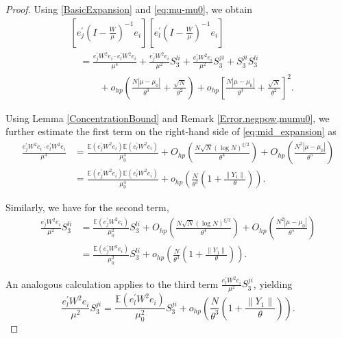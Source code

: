 \documentclass[11pt, reqno]{amsart}
\numberwithin{equation}{section}
\begin{document}
\begin{proof}
Using \eqref{BasicExpansion} and \eqref{eq:mu-mu0}, we obtain
\begin{align}
\nonumber &\left[e_j^\prime\left(I - \frac{W}{\mu}\right)^{-1}e_i\right]\left[e_l^\prime\left(I - \frac{W}{\mu}\right)^{-1}e_i\right] \\
\nonumber &\quad= \frac{e_j^\prime W^2 e_i \cdot e_l^\prime W^2 e_i}{\mu^4} + \frac{e_j^\prime W^2 e_i}{\mu^2} S_3^{li} + \frac{e_l^\prime W^2 e_i}{\mu^2} S_3^{ji}+ S_3^{ji}S_3^{li} \\
&\qquad\quad+o_{hp}\left(\frac{N|\mu - \mu_0|}{\theta^3} + \frac{\sqrt{N}}{\theta^2}\right) + o_{hp}\left[\frac{N|\mu - \mu_0|}{\theta^3} + \frac{\sqrt{N}}{\theta^2}\right]^2.\label{eq:mid_expansion}
\end{align}

Using Lemma \ref{ConcentrationBound} and Remark \ref{Error.negpow,mumu0}, we further estimate the first term on the right-hand side of \eqref{eq:mid_expansion} as
\begin{align}
\frac{e_j^\prime W^2 e_i \cdot e_l^\prime W^2 e_i}{\mu^4} &= \frac{\mathbb E(e_j^\prime W^2 e_i) \mathbb E(e_l^\prime W^2 e_i)}{\mu_0^4} + O_{hp}\left(\frac{N\sqrt{N}(\log N)^{\xi/2}}{\theta^4}\right) + O_{hp}\left(\frac{N^2|\mu - \mu_0|}{\theta^5}\right) \\
&= \frac{\mathbb E(e_j^\prime W^2 e_i) \mathbb E(e_l^\prime W^2 e_i)}{\mu_0^4} + o_{hp}\left(\frac{N}{\theta^3}\left(1 + \frac{\|Y_1\|}{\theta}\right)\right).\label{eq:first_term_estimate}
\end{align}

Similarly, we have for the second term,
\begin{align}
\frac{e_j^\prime W^2 e_i}{\mu^2} S_3^{li} &= \frac{\mathbb E(e_j^\prime W^2 e_i)}{\mu_0^2} S_3^{li} + O_{hp}\left(\frac{N\sqrt{N}(\log N)^{\xi/2}}{\theta^4}\right) + O_{hp}\left(\frac{N^2|\mu - \mu_0|}{\theta^5}\right) \\
&= \frac{\mathbb E(e_j^\prime W^2 e_i)}{\mu_0^2} S_3^{li} + o_{hp}\left(\frac{N}{\theta^3}\left(1 + \frac{\|Y_1\|}{\theta}\right)\right).\label{eq:second_term_estimate}
\end{align}

An analogous calculation applies to the third term $\frac{e_l^\prime W^2 e_i}{\mu^2} S_3^{ji}$, yielding
\begin{equation}\label{eq:third_term_estimate}
\frac{e_l^\prime W^2 e_i}{\mu^2} S_3^{ji} = \frac{\mathbb E(e_l^\prime W^2 e_i)}{\mu_0^2} S_3^{ji} + o_{hp}\left(\frac{N}{\theta^3}\left(1 + \frac{\|Y_1\|}{\theta}\right)\right).
\end{equation}


\end{proof}
\end{document}
